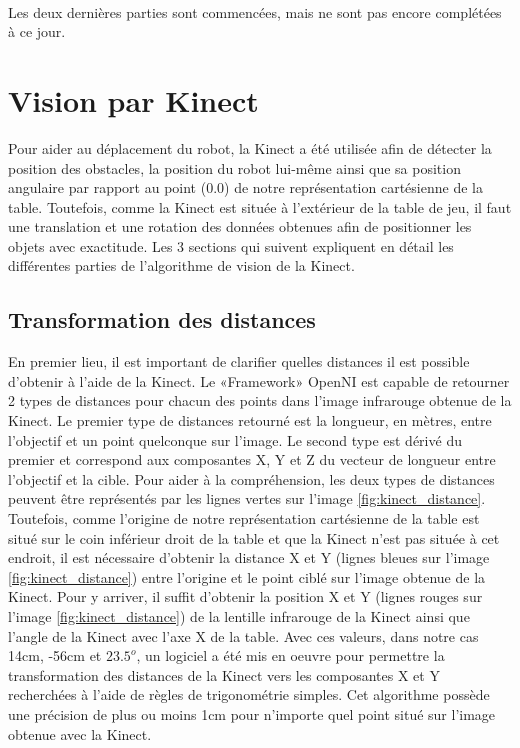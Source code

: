 \paragraph{}Les deux dernières parties sont commencées, mais ne sont pas encore complétées à ce jour.


\section{Vision par Kinect}
Pour aider au déplacement du robot, la Kinect a été utilisée afin de détecter la position des obstacles, la position du robot lui-même ainsi que sa position angulaire par rapport au point (0.0) de notre représentation cartésienne de la table. Toutefois, comme la Kinect est située à l'extérieur de la table de jeu, il faut une translation et une rotation des données obtenues afin de positionner les objets avec exactitude. Les 3 sections qui suivent expliquent en détail les différentes parties de l'algorithme de vision de la Kinect.

\subsection{Transformation des distances}
En premier lieu, il est important de clarifier quelles distances il est possible d'obtenir à l'aide de la Kinect. Le «Framework» OpenNI est capable de retourner 2 types de distances pour chacun des points dans l'image infrarouge obtenue de la Kinect. Le premier type de distances retourné est la longueur, en mètres, entre l'objectif et un point quelconque sur l'image. Le second type est dérivé du premier et correspond aux composantes X, Y et Z du vecteur de longueur entre l'objectif et la cible. Pour aider à la compréhension, les deux types de distances peuvent être représentés par les lignes vertes sur l'image \ref{fig:kinect_distance}. Toutefois, comme l'origine de notre représentation cartésienne de la table est situé sur le coin inférieur droit de la table et que la Kinect n'est pas située à cet endroit, il est nécessaire d'obtenir la distance X et Y (lignes bleues sur l'image \ref{fig:kinect_distance}) entre l'origine et le point ciblé sur l'image obtenue de la Kinect. Pour y arriver, il suffit d'obtenir la position X et Y (lignes rouges sur l'image \ref{fig:kinect_distance}) de la lentille infrarouge de la Kinect ainsi que l'angle de la Kinect avec l'axe X de la table. Avec ces valeurs, dans notre cas 14cm, -56cm et $23.5^o$, un logiciel a été mis en oeuvre pour permettre la transformation des distances de la Kinect vers les composantes X et Y recherchées à l'aide de règles de trigonométrie simples. Cet algorithme possède une précision de plus ou moins 1cm pour n'importe quel point situé sur l'image obtenue avec la Kinect. 

